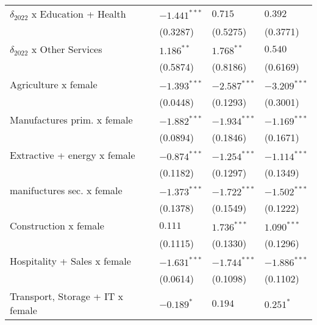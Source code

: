 \begin{table}[h!]
{{\begin{tabular}{llll}
$\delta_{2022}$ x Education + Health               &     $-1.441^{***}$ &            $0.715$ &            $0.392$ \\
                                                   &           (0.3287) &           (0.5275) &           (0.3771) \\
$\delta_{2022}$ x Other Services                   &       $1.186^{**}$ &       $1.768^{**}$ &            $0.540$ \\
                                                   &           (0.5874) &           (0.8186) &           (0.6169) \\
Agriculture x female                               &     $-1.393^{***}$ &     $-2.587^{***}$ &     $-3.209^{***}$ \\
                                                   &           (0.0448) &           (0.1293) &           (0.3001) \\
Manufactures prim. x female                        &     $-1.882^{***}$ &     $-1.934^{***}$ &     $-1.169^{***}$ \\
                                                   &           (0.0894) &           (0.1846) &           (0.1671) \\
Extractive + energy x female                       &     $-0.874^{***}$ &     $-1.254^{***}$ &     $-1.114^{***}$ \\
                                                   &           (0.1182) &           (0.1297) &           (0.1349) \\
manifuctures sec. x female                         &     $-1.373^{***}$ &     $-1.722^{***}$ &     $-1.502^{***}$ \\
                                                   &           (0.1378) &           (0.1549) &           (0.1222) \\
Construction x female                              &            $0.111$ &      $1.736^{***}$ &      $1.090^{***}$ \\
                                                   &           (0.1115) &           (0.1330) &           (0.1296) \\
Hospitality + Sales x female                       &     $-1.631^{***}$ &     $-1.744^{***}$ &     $-1.886^{***}$ \\
                                                   &           (0.0614) &           (0.1098) &           (0.1102) \\
Transport, Storage + IT x female                   &         $-0.189^*$ &            $0.194$ &          $0.251^*$ \\

\end{tabular}}}
\end{table}

